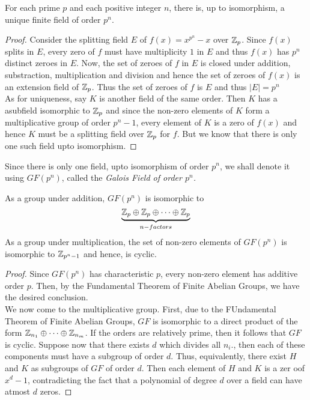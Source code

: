 \begin{proposition}
	For each prime $p$ and each positive integer $n$, there is, up to isomorphism, a unique finite field of order $p^n$.
\end{proposition}
\begin{proof}
	Consider the splitting field $E$ of $f(x)=x^{p^n}-x$ over $\mathbb{Z}_p$. Since $f(x)$ splits in $E$, every zero of $f$ must have multiplicity $1$ in $E$ and thus $f(x)$ has $p^n$ distinct zeroes in $E$. Now, the set of zeroes of $f$ in $E$ is closed under addition, substraction, multiplication and division and hence the set of zeroes of $f(x)$ is an extension field of $\mathbb{Z}_p$. Thus the set of zeroes of $f$ is $E$ and thus $|E|=p^n$\\
	As for uniqueness, say $K$ is another field of the same order. Then $K$ has a asubfield isomorphic to $\mathbb{Z}_p$ and since the non-zero elements of $K$ form a multiplicative group of order $p^n-1$, every element of $K$ is a zero of $f(x)$ and hence $K$ must be a splitting field over $\mathbb{Z}_p$ for $f$. But we know that there is only one such field upto isomorphism.
\end{proof}

\begin{definition}
	Since there is only one field, upto isomorphism of order $p^n$, we shall denote it using $GF(p^n)$, called the \textit{Galois Field of order $p^n$.}
\end{definition}

\begin{proposition}
	As a group under addition, $GF(p^n)$ is isomorphic to 
	\begin{equation*}
		\underbrace{\mathbb{Z}_p\oplus\mathbb{Z}_p\oplus\cdots\oplus\mathbb{Z}_p}_{n-factors}
	\end{equation*}
	As a group under multiplication, the set of non-zero elements of $GF(p^n)$ is isomorphic to $\mathbb{Z}_{p^n-1}$ and hence, is cyclic.
\end{proposition}
\begin{proof}
	Since $GF(p^n)$ has characteristic $p$, every non-zero element has additive order $p$. Then, by the Fundamental Theorem of Finite Abelian Groups, we have the desired conclusion.\\
	We now come to the multiplicative group. First, due to the FUndamental Theorem of Finite Abelian Groups, $GF$ is isomorphic to a direct product of the form $\mathbb{Z}_{n_1}\oplus\cdots\oplus\mathbb{Z}_{n_m}$. If the orders are relatively prime, then it follows that $GF$ is cyclic. Suppose now that there exists $d$ which divides all $n_i$., then each of these components must have a subgroup of order $d$. Thus, equivalently, there exist $H$ and $K$ as subgroups of $GF$ of order $d$. Then each element of $H$ and $K$ is a zer oof $x^d-1$, contradicting the fact that a polynomial of degree $d$ over a field can have atmost $d$ zeros.
\end{proof}

